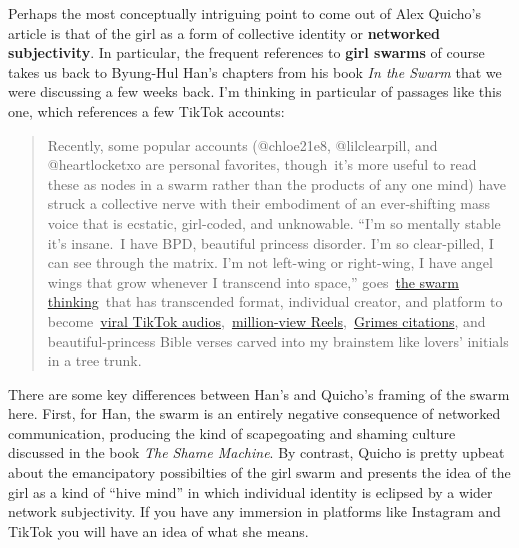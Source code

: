 \documentclass[
  letterpaper,
  DIV=11,
  numbers=noendperiod,
  oneside]{scrartcl}
\begin{document}
Perhaps the most conceptually intriguing point to come out of Alex
Quicho's article is that of the girl as a form of collective identity or
\textbf{networked subjectivity}. In particular, the frequent references
to \textbf{girl swarms} of course takes us back to Byung-Hul Han's
chapters from his book \emph{In the Swarm} that we were discussing a few
weeks back. I'm thinking in particular of passages like this one, which
references a few TikTok accounts:

\begin{quote}
Recently, some popular accounts
(@chloe21e8,
@lilclearpill,
and
@heartlocketxo
are personal favorites, though~it's more useful to read these as nodes
in a swarm rather than the products of any one mind) have struck a
collective nerve with their embodiment of an ever-shifting mass voice
that is ecstatic, girl-coded, and unknowable. ``I'm so mentally stable
it's insane.~I have BPD, beautiful princess disorder. I'm so
clear-pilled, I can see through the matrix. I'm not left-wing or
right-wing, I have angel wings that grow whenever I transcend into
space,''
goes~\href{https://www.tiktok.com/@basedredactedgang/video/7257143957312802053}{the
swarm thinking}~that has transcended format, individual creator, and
platform to
become~\href{https://www.tiktok.com/music/original-sound-7257143960665606918}{viral
TikTok
audios},~\href{https://www.instagram.com/reel/Cvx2c8primP/}{million-view
Reels},~\href{https://twitter.com/Grimezsz/status/1691229470844493824}{Grimes
citations}, and beautiful-princess Bible verses carved into my brainstem
like lovers' initials in a tree trunk.
\end{quote}

There are some key differences between Han's and Quicho's framing of the
swarm here. First, for Han, the swarm is an entirely negative
consequence of networked communication, producing the kind of
scapegoating and shaming culture discussed in the book \emph{The Shame
Machine}. By contrast, Quicho is pretty upbeat about the emancipatory
possibilties of the girl swarm and presents the idea of the girl as a
kind of ``hive mind'' in which individual identity is eclipsed by a
wider network subjectivity. If you have any immersion in platforms like
Instagram and TikTok you will have an idea of what she means.
\end{document}

